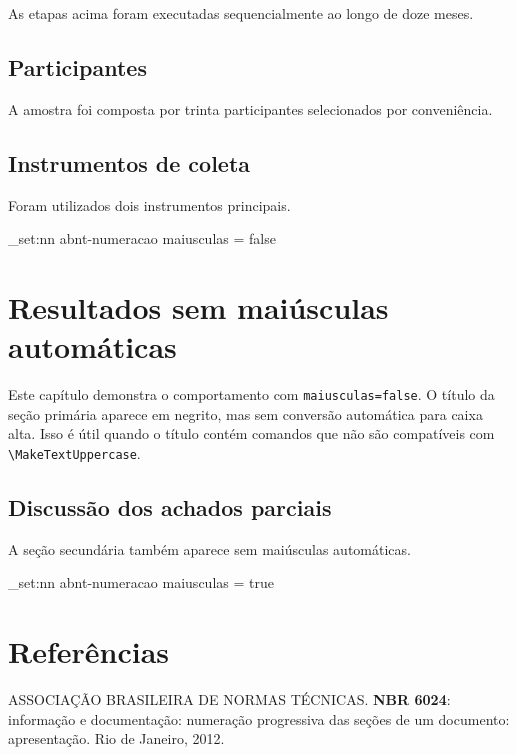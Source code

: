 \documentclass[a4paper, 12pt]{report}
\begin{document}
As etapas acima foram executadas sequencialmente ao longo de doze meses.

\section{Participantes}

A amostra foi composta por trinta participantes selecionados por conveniência.

\section{Instrumentos de coleta}

Foram utilizados dois instrumentos principais.

\ExplSyntaxOn
\keys_set:nn { abnt-numeracao } { maiusculas = false }
\ExplSyntaxOff

\chapter{Resultados sem maiúsculas automáticas}

Este capítulo demonstra o comportamento com \texttt{maiusculas=false}. O título
da seção primária aparece em negrito, mas sem conversão automática para caixa
alta. Isso é útil quando o título contém comandos que não são compatíveis com
\verb|\MakeTextUppercase|.

\section{Discussão dos achados parciais}

A seção secundária também aparece sem maiúsculas automáticas.

\ExplSyntaxOn
\keys_set:nn { abnt-numeracao } { maiusculas = true }
\ExplSyntaxOff

\chapter*{Referências}

ASSOCIAÇÃO BRASILEIRA DE NORMAS TÉCNICAS. \textbf{NBR 6024}: informação e
documentação: numeração progressiva das seções de um documento: apresentação.
Rio de Janeiro, 2012.
\end{document}
